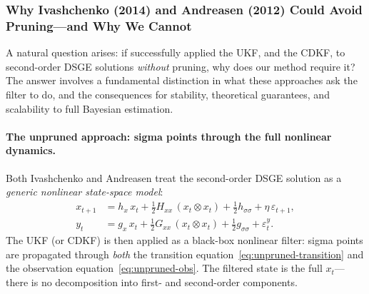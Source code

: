 \documentclass[12pt,a4paper]{article}
\newcommand{\kron}{\otimes}
\newcommand{\gx}{g_x}
\newcommand{\hx}{h_x}
\newcommand{\Gxx}{G_{xx}}
\newcommand{\Hxx}{H_{xx}}
\newcommand{\gss}{{g_{\sigma\sigma}}}
\newcommand{\hsig}{{h_{\sigma\sigma}}}
\begin{document}
\subsubsection{Why Ivashchenko (2014) and Andreasen (2012) Could Avoid
Pruning---and Why We Cannot}\label{sec:why-pruning}

A natural question arises: if \citet{ivashchenko2014dsge} successfully
applied the UKF, and \citet{andreasen2012non} the CDKF, to
second-order DSGE solutions \emph{without} pruning, why does our
method require it? The answer involves a fundamental distinction
in what these approaches ask the filter to do, and the consequences
for stability, theoretical guarantees, and scalability to full
Bayesian estimation.

\paragraph{The unpruned approach: sigma points through the full
nonlinear dynamics.}
Both Ivashchenko and Andreasen treat the second-order DSGE solution
as a \emph{generic nonlinear state-space model}:
\begin{align}
x_{t+1} &= \hx\,x_t
  + \tfrac{1}{2}\Hxx\,(x_t \kron x_t)
  + \tfrac{1}{2}\hsig + \eta\,\varepsilon_{t+1},
  \label{eq:unpruned-transition} \\
y_t &= \gx\,x_t
  + \tfrac{1}{2}\Gxx\,(x_t \kron x_t)
  + \tfrac{1}{2}\gss + \varepsilon_t^y.
  \label{eq:unpruned-obs}
\end{align}
The UKF (or CDKF) is then applied as a black-box nonlinear filter:
sigma points are propagated through \emph{both} the transition
equation~\eqref{eq:unpruned-transition} and the observation
equation~\eqref{eq:unpruned-obs}. The filtered state is the full
$x_t$---there is no decomposition into first- and second-order
components.
\end{document}
